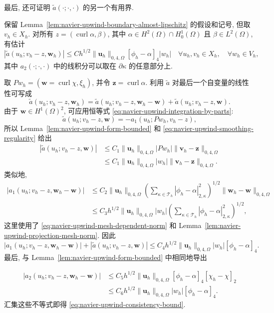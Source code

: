 最后, 还可证明
$\widetilde a(\mathord\cdot;\mathord\cdot,\mathord\cdot)$ 的另一个有用界.

\setcounter{statement}{3}
\begin{Lemma}\label{lem:navier-upwind-consistency-bound}
保留 Lemma~\ref{lem:navier-upwind-boundary-almost-lipschitz} 的假设和记号,
但取 $v_h\in X_h$. 对所有
$z=(\operatorname{curl}\alpha,\beta)$, 其中
$\alpha\in H^2(\Omega)\cap H_0^1(\Omega)$ 且 $\beta\in L^2(\Omega)$, 有估计
\begin{equation}\label{eq:navier-upwind-consistency-bound}
|\widetilde a(u_h;v_h-z,\boldsymbol w_h)|
\leq Ch^{1/2}\|\boldsymbol u_h\|_{0,4,\Omega}
[\phi_h-\alpha]_4|w_h|
\quad\forall u_h,v_h\in X_h,
\quad\forall w_h\in V_h,
\end{equation}
其中 $a_2(\mathord\cdot;\mathord\cdot,\mathord\cdot)$ 中的线积分可以取在
$\partial\kappa$ 的任意部分上.
\end{Lemma}
\begin{Proof}
取 $Pw_h=(\boldsymbol w=\operatorname{curl}\chi,\xi_h)$, 并令
$\boldsymbol z=\operatorname{curl}\alpha$. 利用 $\widetilde a$ 对最后一个自变量的线性性可写成
\[
\widetilde a(u_h;v_h-z,\boldsymbol w_h)
=\widetilde a(u_h;v_h-z,\boldsymbol w_h-\boldsymbol w)
+\widetilde a(u_h;v_h-z,\boldsymbol w).
\]
由于 $\boldsymbol w\in H^1(\Omega)^2$, 可应用恒等式
\eqref{eq:navier-upwind-integration-by-parts}:
\[
\widetilde a(u_h;v_h-z,\boldsymbol w)
=-a_1(u_h;Pw_h,v_h-z),
\]
所以 Lemma~\ref{lem:navier-upwind-form-bounded} 和
\eqref{eq:navier-upwind-smoothing-regularity} 给出
\[
\begin{aligned}
|\widetilde a(u_h;v_h-z,\boldsymbol w)|
&\leq C_1\|\boldsymbol u_h\|_{0,4,\Omega}|Pw_h|
\|\boldsymbol v_h-\boldsymbol z\|_{0,4,\Omega}\\
&\leq C_1\|\boldsymbol u_h\|_{0,4,\Omega}|w_h|
\|\boldsymbol v_h-\boldsymbol z\|_{0,4,\Omega}.
\end{aligned}
\]
类似地,
\[
\begin{aligned}
|a_1(u_h;v_h-z,\boldsymbol w_h-\boldsymbol w)|
&\leq C_2\|\boldsymbol u_h\|_{0,4,\Omega}
\left(\sum_{\kappa\in\mathcal T_h}|\phi_h-\alpha|_{2,\kappa}^2\right)^{1/2}
\|\boldsymbol w_h-\boldsymbol w\|_{0,4,\Omega}\\
&\leq C_3h^{1/2}\|\boldsymbol u_h\|_{0,4,\Omega}|w_h|
\left(\sum_{\kappa\in\mathcal T_h}|\phi_h-\alpha|_{2,\kappa}^2\right)^{1/2},
\end{aligned}
\]
这里使用了 \eqref{eq:navier-upwind-mesh-dependent-norm} 和
Lemma~\ref{lem:navier-upwind-projection-mesh-norm}. 因此
\[
|a_1(u_h;v_h-z,\boldsymbol w_h-\boldsymbol w)|
+|\widetilde a(u_h;v_h-z,\boldsymbol w)|
\leq C_4h^{1/2}\|\boldsymbol u_h\|_{0,4,\Omega}|w_h|
[\phi_h-\alpha]_4.
\]
最后, 与 Lemma~\ref{lem:navier-upwind-form-bounded} 中相同地导出

\[
\begin{aligned}
|a_2(u_h;v_h-z,\boldsymbol w_h-\boldsymbol w)|
&\leq C_5h^{1/2}\|\boldsymbol u_h\|_{0,4,\Omega}
[\phi_h-\alpha]_4[\chi_h-\chi]_2\\
&\leq C_6h^{1/2}\|\boldsymbol u_h\|_{0,4,\Omega}|w_h|
[\phi_h-\alpha]_4.
\end{aligned}
\]
汇集这些不等式即得 \eqref{eq:navier-upwind-consistency-bound}.
\end{Proof}

